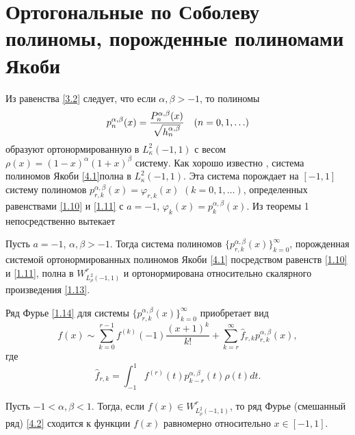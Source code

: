  \section{Ортогональные по Соболеву полиномы, порожденные полиномами Якоби}
Из равенства \eqref{3.2} следует, что если $\alpha,\beta>-1$, то полиномы
\begin{equation}\label{4.1}
p_n^{\alpha,\beta}(x)={P_n^{\alpha,\beta}(x)\over\sqrt{ h_n^{\alpha,\beta}}}\quad(n=0,1,\ldots)
\end{equation}
образуют ортонормированную  в $L_\kappa^2(-1,1)$ с весом $\rho(x)=(1-x)^\alpha(1+x)^\beta$ систему. Как хорошо известно \cite{Sege}, система полиномов Якоби \eqref{4.1}полна в $L_\kappa^2(-1,1)$.   Эта система порождает на $[-1,1]$ систему полиномов  $p_{r,k}^{\alpha,\beta}(x)=\varphi_{r,k}(x)$ $(k=0,1,\ldots)$, определенных равенствами \eqref{1.10} и \eqref{1.11} с $a=-1$, $\varphi_k(x)=p_{k}^{\alpha,\beta}(x)$. Из теоремы 1 непосредственно вытекает
\begin{corollary}
Пусть $a=-1$, $\alpha,\beta>-1$. Тогда система полиномов $\{p_{r,k}^{\alpha,\beta}(x)\}_{k=0}^\infty$, порожденная системой ортонормированных полиномов Якоби \eqref{4.1} посредством равенств \eqref{1.10} и \eqref{1.11}, полна  в $W^r_{L^2_\rho(-1,1)}$ и ортонормирована относительно скалярного произведения \eqref{1.13}.
\end{corollary}

Ряд Фурье \eqref{1.14} для системы   $\{p_{r,k}^{\alpha,\beta}(x)\}_{k=0}^\infty$ приобретает вид
\begin{equation}\label{4.2}
f(x)\sim \sum_{k=0}^{r-1} f^{(k)}(-1)\frac{(x+1)^k}{k!}+ \sum_{k=r}^\infty \hat f_{r,k}p_{r,k}^{\alpha,\beta}(x),
\end{equation}
где
  \begin{equation}\label{4.3}
 \hat f_{r,k}=\int_{-1}^1 f^{(r)}(t)p_{k-r}^{\alpha,\beta}(t)\rho(t)dt.
\end{equation}

\begin{corollary}
Пусть $-1<\alpha,\beta<1$. Тогда, если $f(x)\in W^r_{L^2_\rho(-1,1)}$, то ряд Фурье (смешанный ряд) \eqref{4.2} сходится к функции $f(x)$ равномерно относительно $x\in[-1,1]$.
\end{corollary}

